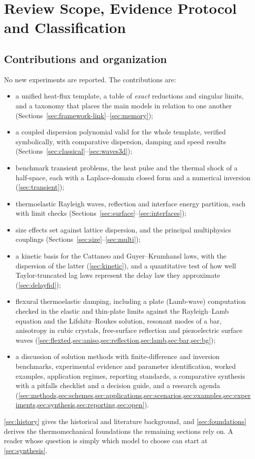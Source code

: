 \section{Review Scope, Evidence Protocol and Classification}\label{sec:part_scope}
\subsection{Contributions and organization}
No new experiments are reported. The contributions are:
\begin{itemize}
\item a unified heat-flux template, a table of \emph{exact} reductions and singular limits, and a taxonomy that places the main models in relation to one another (Sections~\ref{sec:framework-link}--\ref{sec:memory});
\item a coupled dispersion polynomial valid for the whole template, verified symbolically, with comparative dispersion, damping and speed results (Sections~\ref{sec:classical}--\ref{sec:waves3d});
\item benchmark transient problems, the heat pulse and the thermal shock of a half-space, each with a Laplace-domain closed form and a numerical inversion (\cref{sec:transient});
\item thermoelastic Rayleigh waves, reflection and interface energy partition, each with limit checks (Sections~\ref{sec:surface}--\ref{sec:interfaces});
\item size effects set against lattice dispersion, and the principal multiphysics couplings (Sections~\ref{sec:size}--\ref{sec:multi});
\item a kinetic basis for the Cattaneo and Guyer--Krumhansl laws, with the dispersion of the latter (\cref{sec:kinetic}), and a quantitative test of how well Taylor-truncated lag laws represent the delay law they approximate (\cref{sec:delayfid});
\item flexural thermoelastic damping, including a plate (Lamb-wave) computation checked in the elastic and thin-plate limits against the Rayleigh--Lamb equation and the Lifshitz--Roukes solution, resonant modes of a bar, anisotropy in cubic crystals, free-surface reflection and piezoelectric surface waves (\cref{sec:flexted,sec:aniso,sec:reflection,sec:lamb,sec:bar,sec:bg});
\item a discussion of solution methods with finite-difference and inversion benchmarks, experimental evidence and parameter identification, worked examples, application regimes, reporting standards, a comparative synthesis with a pitfalls checklist and a decision guide, and a research agenda (\cref{sec:methods,sec:schemes,sec:applications,sec:scenarios,sec:examples,sec:experiments,sec:synthesis,sec:reporting,sec:open}).
\end{itemize}
\cref{sec:history} gives the historical and literature background, and \cref{sec:foundations} derives the thermomechanical foundations the remaining sections rely on. A reader whose question is simply which model to choose can start at \cref{sec:synthesis}.


